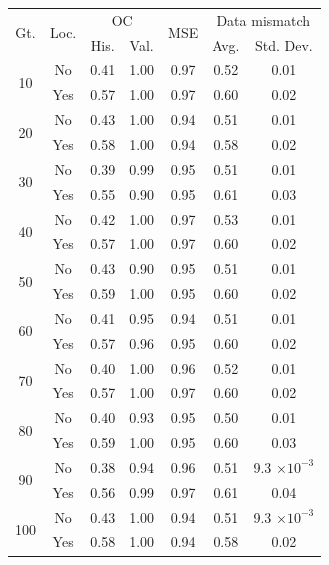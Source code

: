 \begin{tabular}{ccccccc}
\toprule
\multirow{2}{*}{
    Gt.
}
&
\multirow{2}{*}{Loc.} 
& 
\multicolumn{2}{c}{OC} & 
\multirow{2}{*}{
    MSE
} & 
\multicolumn{2}{c}{Data mismatch} 
\\
& & His. & Val. &  & Avg. & Std. Dev.
\\
\midrule
\multirow{2}{*}{10} & No & 0.41 & 1.00 & 0.97 & 0.52 & 0.01 \\
 & Yes & 0.57 & 1.00 & 0.97 & 0.60 & 0.02 \\
\midrule
\multirow{2}{*}{20} & No & 0.43 & 1.00 & 0.94 & 0.51 & 0.01 \\
 & Yes & 0.58 & 1.00 & 0.94 & 0.58 & 0.02 \\
\midrule
\multirow{2}{*}{30} & No & 0.39 & 0.99 & 0.95 & 0.51 & 0.01 \\
 & Yes & 0.55 & 0.90 & 0.95 & 0.61 & 0.03 \\
\midrule
\multirow{2}{*}{40} & No & 0.42 & 1.00 & 0.97 & 0.53 & 0.01 \\
 & Yes & 0.57 & 1.00 & 0.97 & 0.60 & 0.02 \\
\midrule
\multirow{2}{*}{50} & No & 0.43 & 0.90 & 0.95 & 0.51 & 0.01 \\
 & Yes & 0.59 & 1.00 & 0.95 & 0.60 & 0.02 \\
\midrule
\multirow{2}{*}{60} & No & 0.41 & 0.95 & 0.94 & 0.51 & 0.01 \\
 & Yes & 0.57 & 0.96 & 0.95 & 0.60 & 0.02 \\
\midrule
\multirow{2}{*}{70} & No & 0.40 & 1.00 & 0.96 & 0.52 & 0.01 \\
 & Yes & 0.57 & 1.00 & 0.97 & 0.60 & 0.02 \\
\midrule
\multirow{2}{*}{80} & No & 0.40 & 0.93 & 0.95 & 0.50 & 0.01 \\
 & Yes & 0.59 & 1.00 & 0.95 & 0.60 & 0.03 \\
\midrule
\multirow{2}{*}{90} & No & 0.38 & 0.94 & 0.96 & 0.51 & 9.3 $\times 10^{-3}$ \\
 & Yes & 0.56 & 0.99 & 0.97 & 0.61 & 0.04 \\
\midrule
\multirow{2}{*}{100} & No & 0.43 & 1.00 & 0.94 & 0.51 & 9.3 $\times 10^{-3}$ \\
 & Yes & 0.58 & 1.00 & 0.94 & 0.58 & 0.02 \\
\bottomrule
\end{tabular}
